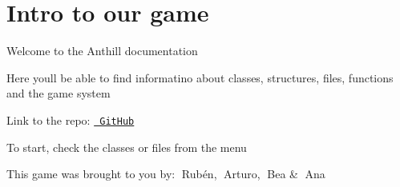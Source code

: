 \chapter{Intro to our game}
\hypertarget{index}{}\label{index}
Welcome to the Anthill documentation 🌱🐜

Here you\textquotesingle{}ll be able to find informatino about classes, structures, files, functions and the game system


\begin{DoxyItemize}
\item Link to the repo\+: \href{https://github.com/Aperezn2006/ANTHILL_REP}{\texttt{ Git\+Hub}}
\item To start, check the classes or files from the menu
\end{DoxyItemize}

This game was brought to you by\+: 🌹\+Rubén, 🌻\+Arturo, 🌷\+Bea \& 🌼\+Ana 